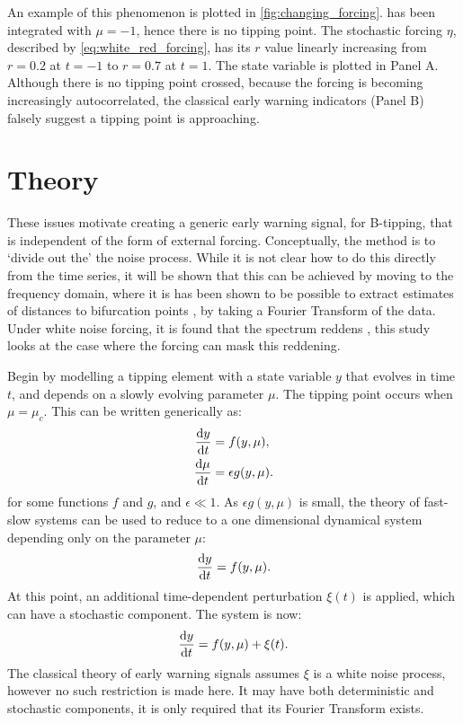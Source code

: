 An example of this phenomenon is plotted in
\cref{fig:changing_forcing}.  
 has been integrated with $\mu = -1$, hence there is no 
tipping point. The stochastic forcing $\eta$, described by \cref{eq:white_red_forcing}, has its $r$ value
linearly increasing
from $r=0.2$ at $t=-1$ to $r=0.7$ at $t=1$. The state
variable is plotted in Panel A. Although there is no
tipping point crossed, because the forcing is becoming 
increasingly autocorrelated, the classical early warning indicators 
(Panel B) falsely suggest a tipping point is approaching.

\section{Theory}
\label{sec:theory}
These issues motivate creating a generic early warning signal, 
for B-tipping, that is 
independent of the form of external forcing. Conceptually,
the method is to `divide out the' the noise process.
While it is not clear
how to do this directly from the time series, it will be shown that this can be achieved by moving
to the frequency domain, where it is has been shown to be possible
to extract estimates of distances to bifurcation 
points \parencite{Kleinen2003}, by taking a Fourier Transform of the data. 
Under white noise forcing, it is found that the spectrum reddens \parencite{Kefi2014,Dakos2012c}, this study looks at the case where the forcing 
can mask this reddening.

Begin by modelling a tipping element with a state variable $y$ that evolves in time $t$, and depends on a slowly evolving parameter $\mu$.  The tipping point occurs when $\mu=\mu_c$.
This can be written generically as:
\begin{align}
\label{eq:full_syste}
    \dv{y}{t} &= f(y,\mu),\\
    \dv{\mu}{t} &= \epsilon g(y,\mu).
\end{align}
for some functions $f$ and $g$, and $\epsilon \ll 1$.
As $\epsilon g(y,\mu)$ is small, the theory of fast-slow systems \parencite{Kuehn2011} can be used to reduce to a one
dimensional dynamical system depending only on the parameter $\mu$:
\begin{equation}
  \label{eq:1d_dynamical_sys}
  \dv{y}{t} = f(y,\mu).
\end{equation}
At this point, an additional time-dependent perturbation $\xi(t)$ is applied, which can have a stochastic component. The system is now:
\begin{equation}
  \label{eq:1d_dyn_sys_forced}
  \dv{y}{t} = f(y,\mu) + \xi(t).
\end{equation}
The classical theory of early warning signals assumes $\xi$ is a white noise process, however no such restriction is made here. It may have both
deterministic and stochastic components, it is only required that its Fourier Transform exists.

